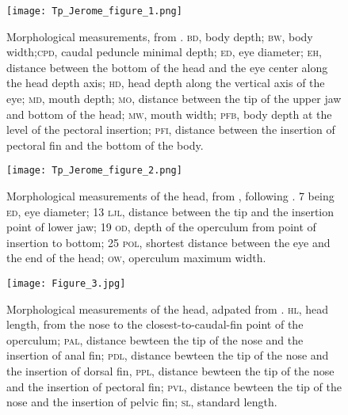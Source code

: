 
\renewcommand\thefigure{\thesection.\arabic{figure}}
\setcounter{figure}{0}

\begin{figure} [!htbp]
	\begin{center}
		\texttt{[image: Tp\_Jerome\_figure\_1.png]}
		\caption[Petite légende]{Morphological measurements, from \citet{albouy2011}. \textsc{bd}, body depth; \textsc{bw}, body width;\textsc{cpd}, caudal peduncle minimal depth; \textsc{ed}, eye diameter; \textsc{eh}, distance between the bottom of the head and the eye center along the head depth axis; \textsc{hd}, head depth along the vertical axis of the eye; \textsc{md}, mouth depth; \textsc{mo}, distance between the tip of the upper jaw and bottom of the head; \textsc{mw}, mouth width; \textsc{pfb}, body depth at the level of the pectoral insertion; \textsc{pfi}, distance between the insertion of pectoral fin and the bottom of the body.}
	\label{fig:app1}
	\end{center}
\end{figure}


\begin{figure} [!htbp]
	\begin{center}
		\texttt{[image: Tp\_Jerome\_figure\_2.png]}
		\caption[Petite légende]{Morphological measurements of the head, from \citet{diderich2006}, following \citet{sibbing2000}. 7 being \textsc{ed}, eye diameter; 13 \textsc{ljl}, distance between the tip and the insertion point of lower jaw; 19 \textsc{od}, depth of the operculum from point of insertion to bottom; 25 \textsc{pol}, shortest distance between the eye and the end of the head; \textsc{ow}, operculum maximum width.}
	\label{fig:app2}
	\end{center}
	
\end{figure}


\begin{figure} [!htbp]
	\begin{center}
		\texttt{[image: Figure\_3.jpg]}
		\caption[Petite légende]{Morphological measurements of the head, adpated from \citet{keat-chuanng2017,habib2019}. \textsc{hl}, head length, from the nose to the closest-to-caudal-fin point of the operculum; \textsc{pal}, distance bewteen the tip of the nose and the insertion of anal fin; \textsc{pdl}, distance bewteen the tip of the nose and the insertion of dorsal fin, \textsc{ppl}, distance bewteen the tip of the nose and the insertion of pectoral fin; \textsc{pvl}, distance bewteen the tip of the nose and the insertion of pelvic fin;  \textsc{sl}, standard length.}
		\label{fig:app3}
	\end{center}
	
\end{figure}

